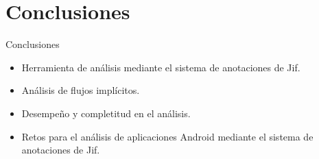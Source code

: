  \section{Conclusiones}
	
\begin{frame}{Conclusiones}
\begin{block}{}
	\begin{itemize}
		\item Herramienta de análisis mediante el sistema de anotaciones de Jif.\pause
		\item Análisis de flujos implícitos.\pause
		\item Desempeño y completitud en el análisis.\pause
		\item Retos para el análisis de aplicaciones Android mediante el sistema de
		anotaciones de Jif.
	\end{itemize}
\end{block}
\end{frame}